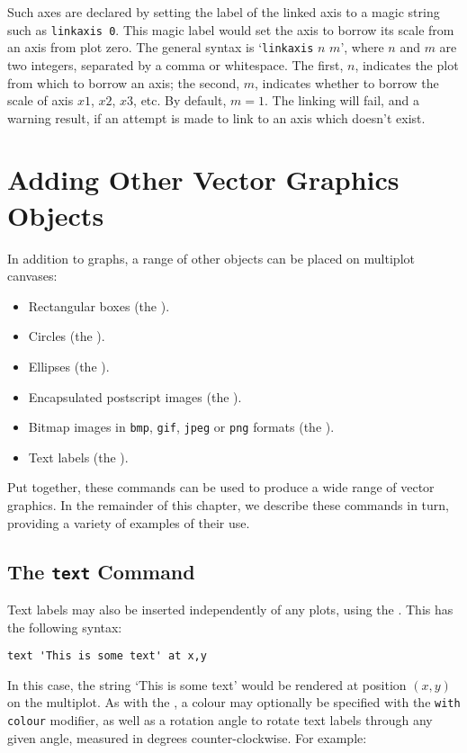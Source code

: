 Such axes are declared by setting the label of the linked axis to a magic
string such as {\tt linkaxis 0}\label{sec:linked_axes}. This magic label would set the axis to borrow
its scale from an axis from plot zero. The general syntax is `{\tt linkaxis}
$n$ $m$', where $n$ and $m$ are two integers, separated by a comma or
whitespace. The first, $n$, indicates the plot from which to borrow an axis;
the second, $m$, indicates whether to borrow the scale of axis $x1$, $x2$,
$x3$, etc. By default, $m=1$. The linking will fail, and a warning result, if
an attempt is made to link to an axis which doesn't exist.

\section{Adding Other Vector Graphics Objects}

In addition to graphs, a range of other objects can be placed on multiplot
canvases:
\begin{itemize}
\item Rectangular boxes (the ).
\item Circles (the ).
\item Ellipses (the ).
\item Encapsulated postscript images (the ).
\item Bitmap images in {\tt bmp}, {\tt gif}, {\tt jpeg} or {\tt png} formats (the ).
\item Text labels (the ).
\end{itemize}
Put together, these commands can be used to produce a wide range of vector
graphics. In the remainder of this chapter, we describe these commands in turn,
providing a variety of examples of their use.

\subsection{The {\tt text} Command}

Text labels may also be
inserted independently of any plots, using the . This has the
following syntax:

\begin{verbatim} 
text 'This is some text' at x,y
\end{verbatim}

In this case, the string `This is some text' would be rendered at position
$(x,y)$ on the multiplot. As with the , a colour may
optionally be specified with the {\tt with colour} modifier, as well as a
rotation angle to rotate text labels through any given angle, measured in
degrees counter-clockwise. For example:

